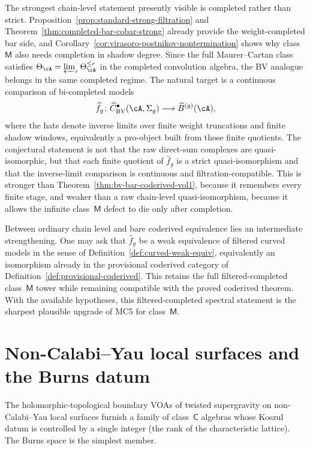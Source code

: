 \begin{remark}
The strongest chain-level statement presently visible is completed
rather than strict. Proposition~\ref{prop:standard-strong-filtration}
and Theorem~\ref{thm:completed-bar-cobar-strong} already provide the
weight-completed bar side, and
Corollary~\ref{cor:virasoro-postnikov-nontermination} shows why
class~$\mathsf{M}$ also needs completion in shadow degree. Since the
full Maurer--Cartan class satisfies
$\Theta_\cA = \varprojlim_r \Theta_\cA^{\le r}$ in the completed
convolution algebra, the BV analogue belongs in the same completed
regime. The natural target is a continuous comparison of
bi-completed models
\[
\widehat f_g \colon
\widehat C^{\bullet}_{\mathrm{BV}}(\cA,\Sigma_g)
\longrightarrow
\widehat B^{(g)}(\cA),
\]
where the hats denote inverse limits over finite weight truncations
and finite shadow windows, equivalently a pro-object built from those
finite quotients. The conjectural statement is not that the raw
direct-sum complexes are quasi-isomorphic, but that each finite
quotient of $\widehat f_g$ is a strict quasi-isomorphism and that the
inverse-limit comparison is continuous and filtration-compatible. This
is stronger than Theorem~\ref{thm:bv-bar-coderived-vol1}, because it
remembers every finite stage, and weaker than a raw chain-level
quasi-isomorphism, because it allows the infinite class~$\mathsf{M}$
defect to die only after completion.

Between ordinary chain level and bare coderived equivalence lies an
intermediate strengthening. One may ask that $\widehat f_g$ be a weak
equivalence of filtered curved models in the sense of
Definition~\ref{def:curved-weak-equiv}, equivalently an isomorphism
already in the provisional coderived category of
Definition~\ref{def:provisional-coderived}. This retains the full
filtered-completed class~$\mathsf{M}$ tower while remaining compatible
with the proved coderived theorem. With the available hypotheses, this
filtered-completed spectral statement is the sharpest plausible
upgrade of MC5 for class~$\mathsf{M}$.
\end{remark}

\section{Non-Calabi--Yau local surfaces and the Burns datum}
\label{sec:non-cy-local-surfaces}

The holomorphic-topological boundary VOAs of twisted supergravity
on non-Calabi--Yau local surfaces furnish a family of class~$\mathsf{C}$
algebras whose Koszul datum is controlled by a single integer
\textup{(}the rank of the characteristic lattice\textup{)}. The Burns
space is the simplest member.

